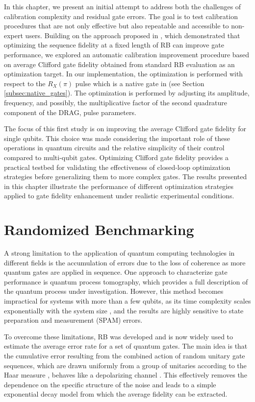 In this chapter, we present an initial attempt to address both the challenges of calibration complexity and residual gate errors. 
The goal is to test calibration procedures that are not only effective but also repeatable and accessible to non-expert users.  
Building on the approach proposed in \cite{kelly_optimal_2014}, which demonstrated that optimizing the sequence fidelity at a fixed length of RB can improve gate performance, we explored an automatic calibration improvement procedure based on average Clifford gate fidelity obtained from standard RB evaluation as an optimization target.
In our implementation, the optimization is performed with respect to the $R_X(\pi)$ pulse which is a native gate in \Qibolab (see Section \ref{subsec:native_gates}).
The optimization is performed by adjusting its amplitude, frequency, and possibly, the multiplicative factor of the second quadrature component of the DRAG, pulse parameters.

The focus of this first study is on improving the average Clifford gate fidelity for single qubits. 
This choice was made considering the important role of these operations in quantum circuits and the relative simplicity of their control compared to multi-qubit gates.
Optimizing Clifford gate fidelity provides a practical testbed for validating the effectiveness of closed-loop optimization strategies before generalizing them to more complex gates.
The results presented in this chapter illustrate the performance of different optimization strategies applied to gate fidelity enhancement under realistic experimental conditions.

\section{Randomized Benchmarking}\label{sec:RBsection}
A strong limitation to the application of quantum computing technologies in different fields is the accumulation of errors due to the loss of coherence as more quantum gates are applied in sequence. 
One approach to characterize gate performance is quantum process tomography, which provides a full description of the quantum process under investigation. 
However, this method becomes impractical for systems with more than a few qubits, as its time complexity scales exponentially with the system size \cite{QPTomography}, and the results are highly sensitive to state preparation and measurement (SPAM) errors.

To overcome these limitations, RB was developed and is now widely used to estimate the average error rate for a set of quantum gates. 
The main idea is that the cumulative error resulting from the combined action of random unitary gate sequences, which are drawn uniformly from a group of unitaries according to the Haar measure \cite{Mele_2024}, behaves like a depolarizing channel \cite{Emerson_2005_RB}. 
This effectively removes the dependence on the specific structure of the noise and leads to a simple exponential decay model from which the average fidelity can be extracted.

